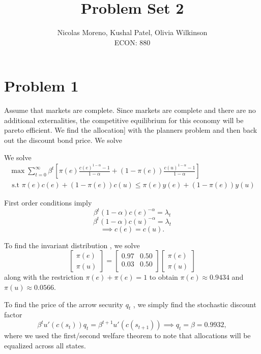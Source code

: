 \documentclass[10pt]{article}
\begin{document}
 
\title{Problem Set 2}
\author{Nicolas Moreno, Kushal Patel, Olivia Wilkinson \\
ECON: 880}
\maketitle

\section{Problem 1}

Assume that markets are complete. Since markets are complete and there are no additional externalities, the competitive equilibrium for this economy will be pareto efficient. We find the allocation]
with the planners problem and then back out the discount bond price. We solve

We solve 
\begin{align*}
    \max \sum_{t = 0}^{\infty} \beta^{t} \left[ \pi (e) \frac{c(e)^{1 - \alpha} - 1}{1 - \alpha} + (1 - \pi (e) ) \frac{c(u)^{1 - \alpha} - 1}{1 - \alpha}  \right] \\
    \text{ s.t } \pi (e) c(e) + (1 - \pi (e)) c(u) \leq \pi (e) y(e) + (1 - \pi (e)) y(u)
\end{align*}

First order conditions imply 
\[ \beta^{t} (1 - \alpha) c(e)^{- \alpha} =  \lambda_{t}\]
\[\beta^{t}  (1 - \alpha) c(u)^{- \alpha} =  \lambda_{t} \]
\[ \implies c(e) = c(u). \]

To find the invariant distribution , we solve 
\begin{equation*}
    \begin{bmatrix}
        \pi(e) \\
        \pi(u)
    \end{bmatrix} =
    \begin{bmatrix}
        0.97 & 0.50 \\
        0.03 & 0.50 \\
    \end{bmatrix}
    \begin{bmatrix}
        \pi(e) \\
        \pi(u)
    \end{bmatrix} 
\end{equation*}
along with the restriction $\pi(e) + \pi(e) = 1$ to obtain $\pi (e) \approx 0.9434$ and $ \pi (u) \approx 0.0566$. 

To find the price of the arrow security $q_t$ , we simply find the stochastic discount factor 
\[ \beta^{t} u'(c(s_{t})) q_{t} = \beta^{t+1} u'(c(s_{t+1})) \implies q_{t} = \beta = 0.9932, \]
where we used the first/second welfare theorem to note that allocations will be equalized across all states. 
\end{document}
